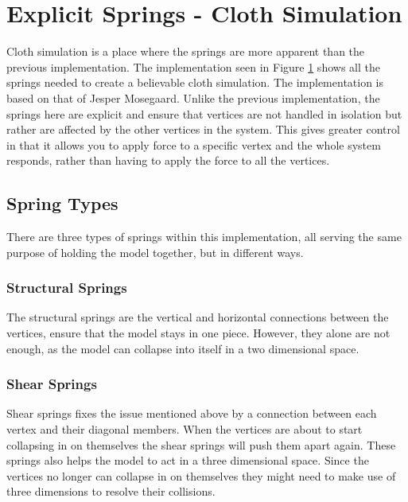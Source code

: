 \section{Explicit Springs - Cloth Simulation}
Cloth simulation is a place where the springs are more apparent than the previous implementation.
The implementation seen in Figure \ref{fig:my_cloth_implementation_springs} shows all the springs needed to create a believable cloth simulation.
The implementation is based on that of Jesper Mosegaard\cite{mosegaards_clothing_simulation}.
Unlike the previous implementation, the springs here are explicit and ensure that vertices are not handled in isolation but rather are affected by the other vertices in the system.
This gives greater control in that it allows you to apply force to a specific vertex and the whole system responds, rather than having to apply the force to all the vertices.




\begin{figure}
    \label{fig:my_cloth_implementation_springs}
\end{figure}


\subsection{Spring Types}
There are three types of springs within this implementation, all serving the same purpose of holding the model together,
but in different ways.

\subsubsection{Structural Springs}
The structural springs are the vertical and horizontal connections between the vertices,
ensure that the model stays in one piece.
However, they alone are not enough, as the model can collapse into itself in a two dimensional space.

\subsubsection{Shear Springs}
Shear springs fixes the issue mentioned above by a connection between each vertex and their diagonal members.
When the vertices are about to start collapsing in on themselves the shear springs will push them apart again.
These springs also helps the model to act in a three dimensional space.
Since the vertices no longer can collapse in on themselves they might need to make use of three dimensions to
resolve their collisions.

